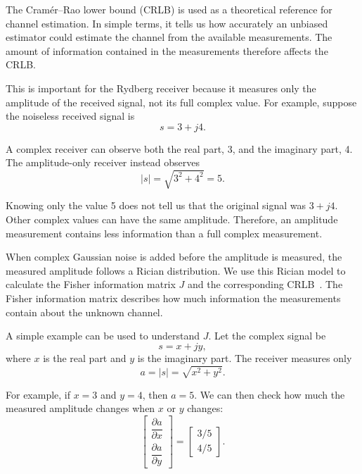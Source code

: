 \documentclass[journal]{IEEEtran}
\begin{document}
The Cram\'er--Rao lower bound (CRLB) is used as a theoretical reference for
channel estimation. In simple terms, it tells us how accurately an unbiased
estimator could estimate the channel from the available measurements. The
amount of information contained in the measurements therefore affects the CRLB.

This is important for the Rydberg receiver because it measures only the
amplitude of the received signal, not its full complex value. For example,
suppose the noiseless received signal is
\begin{equation}
s=3+j4.
\end{equation}

A complex receiver can observe both the real part, 3, and the imaginary part,
4. The amplitude-only receiver instead observes
\begin{equation}
|s|=\sqrt{3^2+4^2}=5.
\end{equation}

Knowing only the value 5 does not tell us that the original signal was $3+j4$.
Other complex values can have the same amplitude. Therefore, an amplitude
measurement contains less information than a full complex measurement.

When complex Gaussian noise is added before the amplitude is measured, the
measured amplitude follows a Rician distribution. We use this Rician model to
calculate the Fisher information matrix $J$ and the corresponding
CRLB~\cite{balan2015,cui2025}. The Fisher information matrix describes how much
information the measurements contain about the unknown channel.

A simple example can be used to understand $J$. Let the complex signal be
\begin{equation}
s=x+jy,
\end{equation}
where $x$ is the real part and $y$ is the imaginary part. The receiver measures
only
\begin{equation}
a=|s|=\sqrt{x^2+y^2}.
\end{equation}

For example, if $x=3$ and $y=4$, then $a=5$. We can then check how much the
measured amplitude changes when $x$ or $y$ changes:
\begin{equation}
\begin{bmatrix}\dfrac{\partial a}{\partial x}\\[6pt]
\dfrac{\partial a}{\partial y}\end{bmatrix}
=\begin{bmatrix}3/5\\[3pt]4/5\end{bmatrix}.
\end{equation}
\end{document}
